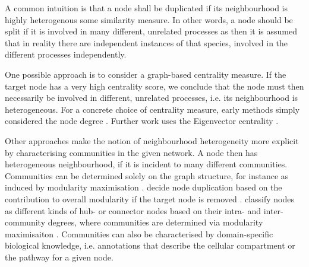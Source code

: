 \documentclass[
	fontsize=10pt, %
	twoside=false, %
	secnumdepth=1, %
  toc=indentunnumbered %
]{kaobook}
\begin{document}
%



A common intuition is that a node shall be duplicated if its
neighbourhood is highly heterogenous \wrt some similarity measure. In other words, a
node should be split if it is involved in many different, unrelated processes
as then it is assumed that in reality there are independent instances of that
species, involved in the different processes independently.

One possible approach is to consider a graph-based centrality measure. If the
target node has a very high centrality score, we conclude that 
the node must then necessarily be involved in different, unrelated processes, i.e.
its neighbourhood is heterogeneous. For a concrete choice of centrality measure,
early methods simply considered the node degree
\cite{ma_ReconstructionMetabolicNetworks_2003,schuster_exploring_2002}.
Further work uses the Eigenvector centrality \cite{manipur_clustering_2020}.

Other approaches make the notion of neighbourhood heterogeneity more explicit by
characterising communities in the given network. A node then has heterogeneous
neighbourhood, if it is incident to many different communities. Communities can
be determined solely on the graph structure, for instance as induced by
modularity maximisation \cite{newman_modularity_2006}.
\citeauthor{huss_CurrencyCommodityMetabolites_2007} decide node duplication
based on the contribution to overall modularity if the target node is removed
\cite{huss_CurrencyCommodityMetabolites_2007}.
\citeauthor{guimera_FunctionalCartographyComplex_2005} classify nodes as
different kinds of hub- or connector nodes based on their intra- and
inter-community degrees, where communities are determined via modularity maximisaiton
\cite{guimera_FunctionalCartographyComplex_2005}. Communities can also be
characterised by domain-specific biological knowledge, i.e. annotations that
describe the cellular compartment \cite{manipur_clustering_2020} or the pathway 
\cite{rohrschneider_NovelGridBasedVisualization_2010}
\cite{joshi-tope_ReactomeKnowledgebaseBiological_2005} for a given node.
\end{document}
